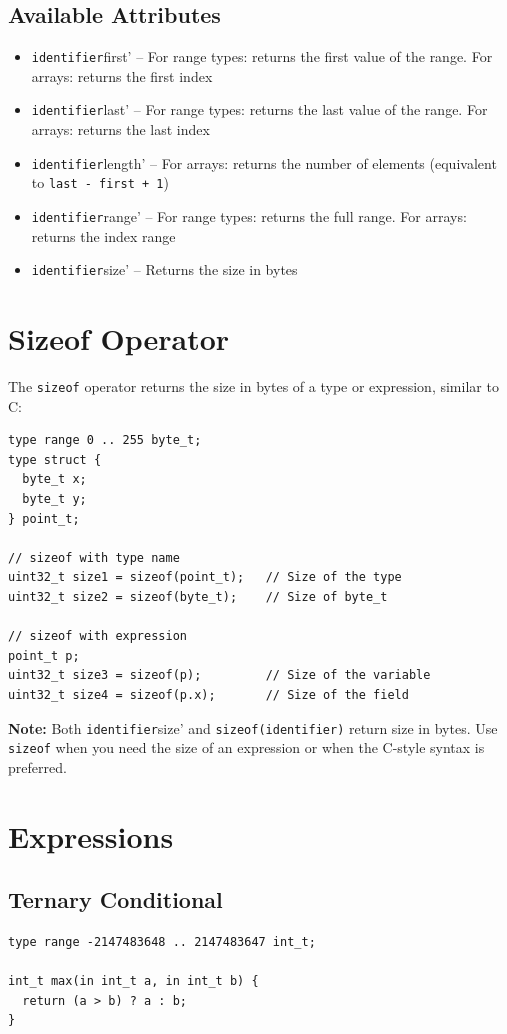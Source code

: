 \documentclass[11pt,letterpaper,twoside,openany]{book}
\begin{document}
\subsection{Available Attributes}

\begin{itemize}
\item \verb'identifier'first' -- For range types: returns the first value of the range. For arrays: returns the first index
\item \verb'identifier'last' -- For range types: returns the last value of the range. For arrays: returns the last index
\item \verb'identifier'length' -- For arrays: returns the number of elements (equivalent to \verb'last - first + 1')
\item \verb'identifier'range' -- For range types: returns the full range. For arrays: returns the index range
\item \verb'identifier'size' -- Returns the size in bytes
\end{itemize}

\section{Sizeof Operator}

The \verb'sizeof' operator returns the size in bytes of a type or expression, similar to C:

\begin{lstlisting}
type range 0 .. 255 byte_t;
type struct {
  byte_t x;
  byte_t y;
} point_t;

// sizeof with type name
uint32_t size1 = sizeof(point_t);   // Size of the type
uint32_t size2 = sizeof(byte_t);    // Size of byte_t

// sizeof with expression
point_t p;
uint32_t size3 = sizeof(p);         // Size of the variable
uint32_t size4 = sizeof(p.x);       // Size of the field
\end{lstlisting}

\textbf{Note:} Both \verb'identifier'size' and \verb'sizeof(identifier)' return size in bytes. Use \verb'sizeof' when you need the size of an expression or when the C-style syntax is preferred.

\section{Expressions}

\subsection{Ternary Conditional}
\begin{lstlisting}
type range -2147483648 .. 2147483647 int_t;

int_t max(in int_t a, in int_t b) {
  return (a > b) ? a : b;
}
\end{lstlisting}
\end{document}
